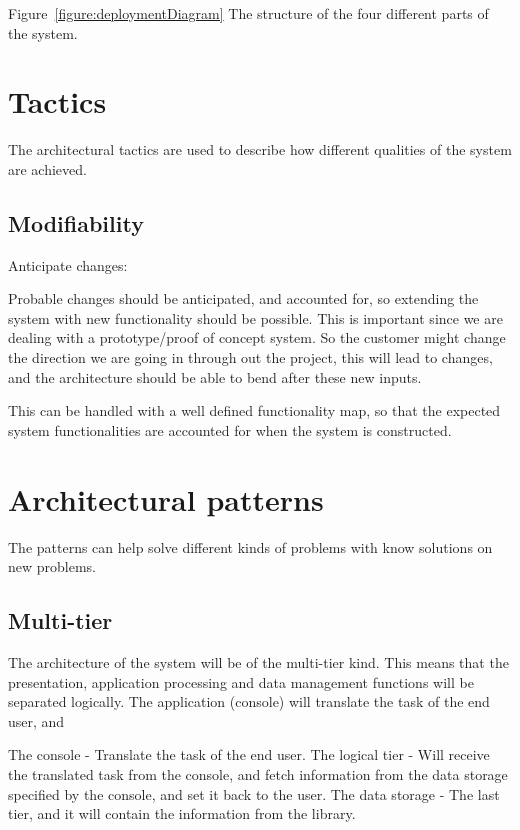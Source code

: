 Figure~\ref{figure:deploymentDiagram} The structure of the four different parts of the system.





\section{Tactics}
The architectural tactics are used to describe how different qualities of the system are achieved. 

\subsection{Modifiability}
Anticipate changes:

Probable changes should be anticipated, and accounted for, so extending the system with new functionality should be possible. This is important since we are dealing with a prototype/proof of concept system. So the customer might change the direction we are going in through out the project, this will lead to changes, and the architecture should be able to bend after these new inputs. 

This can be handled with a well defined functionality map, so that the expected system functionalities are accounted for when the system is constructed. 


\section{Architectural patterns}
The patterns can help solve different kinds of problems with know solutions on new problems.

\subsection{Multi-tier}

The architecture of the system will be of the multi-tier kind. This means that the presentation, application processing and data management functions will be separated logically. The application (console) will translate the task of the end user, and 

The console - Translate the task of the end user.
The logical tier - Will receive the translated task from the console, and fetch information from the data storage specified by the console, and set it back to the user.
The data storage - The last tier, and it will contain the information from the library.

